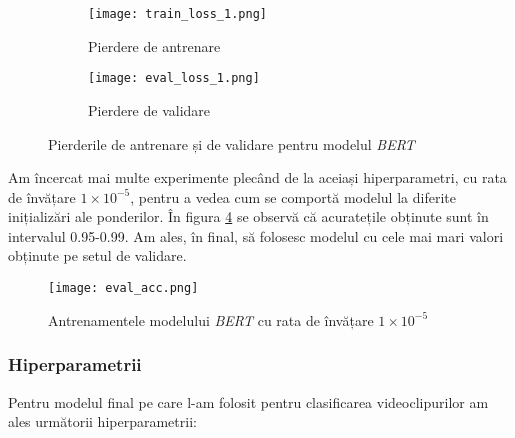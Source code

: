 \begin{figure}[ht]
    \centering
    \begin{subfigure}[b]{0.49\textwidth}
        \texttt{[image: train\_loss\_1.png]}
        \caption{Pierdere de antrenare}
        \label{fig:train_loss}
    \end{subfigure}
    \hfill %
    \begin{subfigure}[b]{0.49\textwidth}
        \texttt{[image: eval\_loss\_1.png]}
        \caption{Pierdere de validare}
        \label{fig:eval_loss}
    \end{subfigure}
    \caption{Pierderile de antrenare și de validare pentru modelul \textit{BERT}}
    \label{fig:loss_graphs}
\end{figure}
\vspace{-1em}

\par
Am încercat mai multe experimente plecând de la aceiași hiperparametri, cu rata de învățare $1 \times 10^{-5}$,
pentru a vedea cum se comportă modelul la diferite inițializări ale ponderilor. În figura \ref{fig:eval_acc}
se observă că acuratețile obținute sunt în intervalul 0.95-0.99. Am ales, în final, să folosesc modelul
cu cele mai mari valori obținute pe setul de validare.

\begin{figure}[h]
    \centering
    \texttt{[image: eval\_acc.png]}
    \caption{Antrenamentele modelului \textit{BERT} cu rata de învățare $1 \times 10^{-5}$}
    \label{fig:eval_acc}
\end{figure}

\vspace{-1.5em}
\subsubsection{Hiperparametrii}
Pentru modelul final pe care l-am folosit pentru clasificarea videoclipurilor am ales următorii hiperparametrii:



